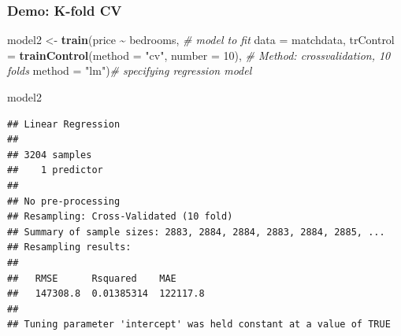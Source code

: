 \documentclass[
  shownotes,
  xcolor={svgnames},
  hyperref={colorlinks,citecolor=DarkBlue,linkcolor=DarkRed,urlcolor=DarkBlue}
  , aspectratio=169]{beamer}
\newenvironment{Shaded}{\begin{snugshade}}{\end{snugshade}}
\newcommand{\CommentTok}[1]{\textcolor[rgb]{0.56,0.35,0.01}{\textit{#1}}}
\newcommand{\DataTypeTok}[1]{\textcolor[rgb]{0.13,0.29,0.53}{#1}}
\newcommand{\DecValTok}[1]{\textcolor[rgb]{0.00,0.00,0.81}{#1}}
\newcommand{\KeywordTok}[1]{\textcolor[rgb]{0.13,0.29,0.53}{\textbf{#1}}}
\newcommand{\NormalTok}[1]{#1}
\newcommand{\OperatorTok}[1]{\textcolor[rgb]{0.81,0.36,0.00}{\textbf{#1}}}
\newcommand{\StringTok}[1]{\textcolor[rgb]{0.31,0.60,0.02}{#1}}
\begin{document}
\begin{frame}[fragile]
\frametitle{Demo: K-fold CV}

\begin{scriptsize}
\begin{Shaded}
\begin{Highlighting}[]
\NormalTok{model2 \textless{}{-}}\StringTok{ }\KeywordTok{train}\NormalTok{(price }\OperatorTok{\textasciitilde{}}\StringTok{ }\NormalTok{bedrooms,   }\CommentTok{\# model to fit}
                     \DataTypeTok{data =}\NormalTok{ matchdata,                        }
                     \DataTypeTok{trControl =} \KeywordTok{trainControl}\NormalTok{(}\DataTypeTok{method =} \StringTok{"cv"}\NormalTok{, }\DataTypeTok{number =} \DecValTok{10}\NormalTok{),     }
                     \CommentTok{\# Method: crossvalidation, 10 folds}
                     \DataTypeTok{method =} \StringTok{"lm"}\NormalTok{)}\CommentTok{\# specifying regression model}

\NormalTok{model2}
\end{Highlighting}
\end{Shaded}
\end{scriptsize}
\begin{tiny}
\begin{verbatim}
## Linear Regression 
## 
## 3204 samples
##    1 predictor
## 
## No pre-processing
## Resampling: Cross-Validated (10 fold) 
## Summary of sample sizes: 2883, 2884, 2884, 2883, 2884, 2885, ... 
## Resampling results:
## 
##   RMSE      Rsquared    MAE     
##   147308.8  0.01385314  122117.8
## 
## Tuning parameter 'intercept' was held constant at a value of TRUE
\end{verbatim}
\end{tiny}
\end{frame}
\end{document}

